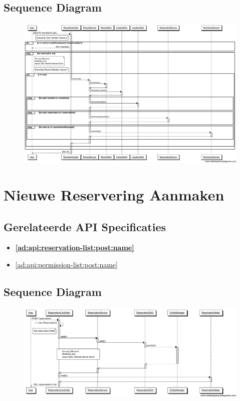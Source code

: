 \documentclass[a4paper,titlepage]{report}
\begin{document}
    \subsection{Sequence Diagram}
    \begin{figure}[H]
      \label{fig:delete-record-sequence}
      \centering
      \includegraphics[totalheight=115mm,trim=0 0.4cm 0
      0,clip,angle=90]{delete_record_sequence.pdf}
    \end{figure}
    \pagebreak

  \section{Nieuwe Reservering Aanmaken}
    \subsection{Gerelateerde API Specificaties}
      \begin{itemize}
        \item \textbf{\ref{ad:api:reservation-list:post:name}}
        \item \ref{ad:api:permission-list:post:name}
      \end{itemize}
    \subsection{Sequence Diagram}
    \begin{figure}[H]
      \label{fig:post-reservation-sequence}
      \centering
      \includegraphics[width=\textwidth,trim=0 0.4cm 0
      0,clip]{post_reservation_sequence.pdf}
    \end{figure}
    \pagebreak
\end{document}
